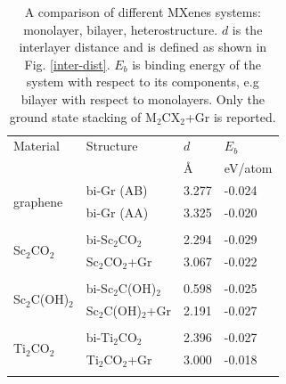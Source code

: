 \begin{table}[htb]
\centering
\caption{A comparison of different MXenes systems: monolayer, bilayer, heterostructure. $d$ is the interlayer distance and is defined as shown in Fig. \ref{inter-dist}. $E_b$ is binding energy of the system with respect to its components, e.g bilayer with respect to monolayers. Only the ground state stacking of M$_2$CX$_2$+Gr is reported.} 
\label{tableI}
\begin{tabularx}{0.8\linewidth}{XXXX}
\hline
Material      & Structure                         & $d$               & $E_b$               \\
              &                                    & \AA                & eV/atom \\ \hline
\multirow{2}{*}{graphene}      & bi-Gr (AB)                                               & 3.277                    & -0.024                        \\
              & bi-Gr (AA)                                                & 3.325                    & -0.020                         \\ \multicolumn{4}{c}{}\\
\multirow{2}{*}{Sc$_2$CO$_2$}    & bi-Sc$_2$CO$_2$                                                   & 2.294                 & -0.029                         \\
              & Sc$_2$CO$_2$+Gr                                                   & 3.067                   & -0.022                         \\
\multicolumn{4}{c}{}\\              
\multirow{2}{*}{Sc$_2$C(OH)$_2$} & bi-Sc$_2$C(OH)$_2$                                                   & 0.598                  & -0.025                         \\
              & Sc$_2$C(OH)$_2$+Gr                                                     & 2.191                  & -0.027                         \\
\multicolumn{4}{c}{}\\              
\multirow{2}{*}{Ti$_2$CO$_2$}    & bi-Ti$_2$CO$_2$                                                & 2.396                   & -0.027                         \\
              & Ti$_2$CO$_2$+Gr                                                   & 3.000                    & -0.018                         \\
\multicolumn{4}{c}{}\\              

\end{tabularx}
\end{table}
